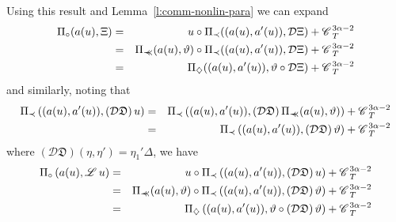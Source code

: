 \documentclass{amsart}
\newcommand{\precprec}{\prec\!\!\!\prec}
\theoremstyle{remark}
\theoremstyle{definition}
\newcommand{\CC}{\mathscr{C} \hspace{.1em}}
\newcommand{\LL}{\mathscr{L} \hspace{.2em}}
\newcommand{\DF}{\mathfrak{D}}
\begin{document}
Using this result and Lemma~\ref{l:comm-nonlin-para} we can expand
\begin{eqnarray*}
  \Pi_{\circ} (a (u), \Xi) & = & u \circ \Pi_{\prec} ((a (u), a' (u)),
  \mathcal{D} \Xi) + \CC_T^{3 \alpha - 2}\\
  & = & \Pi_{\precprec} (a (u), \vartheta) \circ \Pi_{\prec} ((a (u), a'
  (u)), \mathcal{D} \Xi) + \CC_T^{3 \alpha - 2}\\
  & = & \Pi_{\diamondsuit} ((a (u), a' (u)), \vartheta \circ \mathcal{D} \Xi)
  + \CC_T^{3 \alpha - 2}
\end{eqnarray*}
and similarly, noting that
\begin{eqnarray*}
  \Pi_{\prec} \left( (a (u), a' (u)), \left( \mathcal{D} \DF \right) u \right)
  & = & \Pi_{\prec} \left( (a (u), a' (u)), \left( \mathcal{D} \DF \right)
  \Pi_{\precprec} (a (u), \vartheta) \right) + \CC_T^{3 \alpha - 2}\\
  & = & \Pi_{\prec} \left( (a (u), a' (u)), \left( \mathcal{D} \DF \right)
  \vartheta \right) + \CC_T^{3 \alpha - 2}
\end{eqnarray*}
where $\left( \mathcal{D} \DF \right) (\eta, \eta') = \eta_1' \Delta$, we have
\begin{eqnarray*}
  \Pi_{\circ} \left( a (u), \LL u \right) & = & u \circ \Pi_{\prec} \left( (a
  (u), a' (u)), \left( \mathcal{D} \DF \right) u \right) + \CC_T^{3 \alpha -
  2}\\
  & = & \Pi_{\precprec} (a (u), \vartheta) \circ \Pi_{\prec} \left( (a (u),
  a' (u)), \left( \mathcal{D} \DF \right) \vartheta \right) + \CC_T^{3 \alpha
  - 2}\\
  & = & \Pi_{\diamondsuit} \left( (a (u), a' (u)), \vartheta \circ \left(
  \mathcal{D} \DF \right) \vartheta \right) + \CC_T^{3 \alpha - 2}
\end{eqnarray*}
\end{document}

